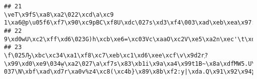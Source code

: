 \documentclass[
]{article}
\begin{document}
\begin{verbatim}
## 21                                                                                                                                                                                                                                                                                                                                                                                                                                                                                                                                                                                                                                                                                                                                                                             \veT\x9fS\xa8\xa2\022\xcd\a\xc9 1\xa6@p\u05f6\xf7\x90\xc9pBC\xf8U\xdc\027s\xd3\xf4\003\xad\xeb\xea׃\x97:o\xd9\036^ϧ\x97O{\x97X
## 22                                                                                                                                                                                                                                                                                                                                                                                                                                                                                                                                                                                                                                                                                                                                                                                                9\xd0wU\xc2\xff\xd6\023G)h\xcb\xe6=\xc03Vc\xaaO\xc2V\xe5\xa2n\xec'\t\xd7Llgd\x9ci\xbb`\xec\xe1\xef\xb7\xe3;
## 23                                                                                                                                                                                                                                                                                                                                                                                                                                                                                      \f\025Ԡ\xbc\xc34\xa1\xf8\xc7\xeb\xc1\xd6\xee\xcf\v\x9d2r֥?\x99\xd0\xe9\034w̖\xa2\027\a\xf7ѕ\x83\xb1i\x9a\xa4\x99t1B~\x8a\xdf֫MW5.U\xbb+\001\xa8Ȥ`\xc2\002\xf7\xda\026\033\xa1\xbd\x8fVД.ãy\xbbÊ;\xbf\016\xebޕ \037N\xbf\xad\xd7r\xa0v%z4\xc8(\xc4b}\x89\x8b\xf2:y|\xda.Q\x91\x92\x94Ɣ\xc6\xe9\xfd\x96\xccY:c\023\xf2\u07be\xfe\xeb~\033\xb3\037\xd4\xe7\f\xff\023\xa71Ic2\xdfR\xc2\xe8\x94Mg#\xe2\005Pd\xf8\xeak\024\xdf

\end{verbatim}
\end{document}
